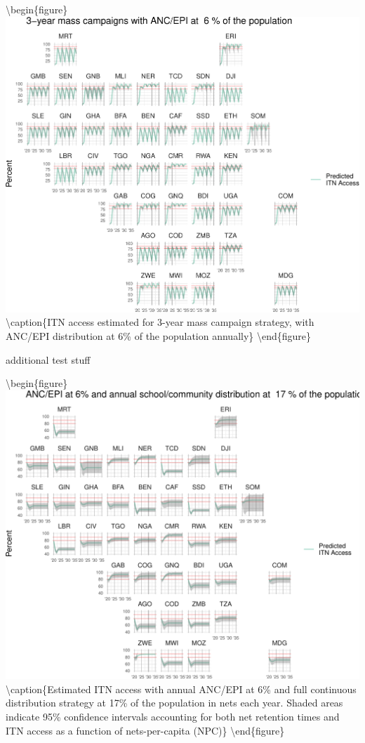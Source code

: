 \documentclass[review,
3p]{elsarticle} %
\begin{document}
\textbackslash begin\{figure\}
\includegraphics[width=0.8\linewidth]{quant_paper_files/figure-latex/geo_facets_3ucc-1}
\textbackslash caption\{\label{geo_facets_3ucc}ITN access estimated for
3-year mass campaign strategy, with ANC/EPI distribution at 6\% of the
population annually\}\label{fig:geo_facets_3ucc}
\textbackslash end\{figure\}

additional test stuff

\textbackslash begin\{figure\}
\includegraphics[width=0.8\linewidth]{quant_paper_files/figure-latex/geo_facets_cd-1}
\textbackslash caption\{\label{geo_facets_cd}Estimated ITN access with
annual ANC/EPI at 6\% and full continuous distribution strategy at 17\%
of the population in nets each year. Shaded areas indicate 95\%
confidence intervals accounting for both net retention times and ITN
access as a function of nets-per-capita (NPC)\}\label{fig:geo_facets_cd}
\textbackslash end\{figure\}
\end{document}
